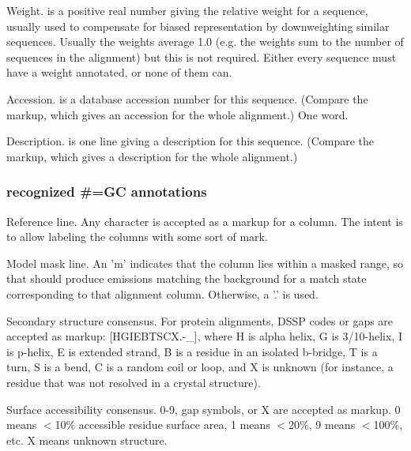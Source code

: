 \begin{sreitems}{}
\item [\emprog{WT  <f>}]
        Weight.  is a positive real number giving the
        relative weight for a sequence, usually used to compensate
        for biased representation by downweighting similar sequences.   
        Usually the weights average 1.0 (e.g. the weights sum to
        the number of sequences in the alignment) but this is not
        required. Either every sequence must have a weight annotated, 
        or none of them can.  

\item [\emprog{AC  <s>}]
        Accession.  is a database accession number for 
        this sequence. (Compare the  markup, which gives
        an accession for the whole alignment.) One word. 
        
\item [\emprog{DE  <s>}]
        Description.  is one line giving a description for
        this sequence. (Compare the  markup, which gives
        a description for the whole alignment.)
\end{sreitems}


\subsubsection{recognized \#=GC annotations}

\begin{sreitems}{}

\item [\emprog{RF}]
        Reference line. Any character is accepted as a markup for a
        column. The intent is to allow labeling the columns with some
        sort of mark.
        
\item [\emprog{MM}]
        Model mask line. An 'm' indicates that the column lies within a 
        masked range, so that  should produce emissions matching
        the background for a match state corresponding to that alignment column.
        Otherwise, a '.' is used.
                
\item [\emprog{SS\_cons}]
        Secondary structure consensus. For protein alignments,
        DSSP codes or gaps are accepted as markup: [HGIEBTSCX.-\_], where
        H is alpha helix, G is 3/10-helix, I is p-helix, E is extended
        strand, B is a residue in an isolated b-bridge, T is a turn, 
        S is a bend, C is a random coil or loop, and X is unknown
        (for instance, a residue that was not resolved in a crystal
        structure). 

\item [\emprog{SA\_cons}]
        Surface accessibility consensus. 0-9, gap symbols, or X are
        accepted as markup. 0 means $<$10\% accessible residue surface
        area, 1 means $<$20\%, 9 means $<$100\%, etc. X means unknown
        structure.
\end{sreitems}


